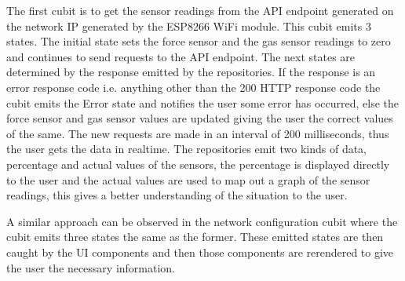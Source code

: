 \documentclass[conference]{IEEEtran}
\begin{document}
The first cubit is to get the sensor readings from the API endpoint
generated on the network IP generated by the ESP8266 WiFi module.
This cubit emits 3 states. The initial state sets the force sensor
and the gas sensor readings to zero and continues to send requests
to the API endpoint. The next states are determined by the response
emitted by the repositories. If the response is an error response
code i.e. anything other than the 200 HTTP response code the cubit
emits the Error state and notifies the user some error has occurred,
else the force sensor and gas sensor values are updated giving the user
the correct values of the same. The new requests are made in an interval
of 200 milliseconds, thus the user gets the data in realtime. The
repositories emit two kinds of data, percentage and actual values of
the sensors, the percentage is displayed directly to the user and the
actual values are used to map out a graph of the sensor readings, this gives
a better understanding of the situation to the user.

A similar approach can be observed in the network configuration cubit where
the cubit emits three states the same as the former. These emitted states
are then caught by the UI components and then those components are rerendered
to give the user the necessary information.



\end{document}
